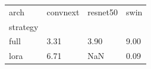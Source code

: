 \begin{tabular}{llll}
\toprule
arch & convnext & resnet50 & swin \\
strategy &  &  &  \\
\midrule
full & 3.31 & 3.90 & 9.00 \\
lora & 6.71 & NaN & 0.09 \\
\bottomrule
\end{tabular}

